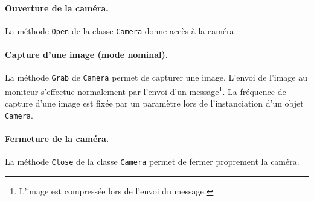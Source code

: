 \paragraph{Ouverture de la caméra.} La méthode {\tt Open} de la classe {\tt Camera} donne accès à la caméra.\\


\paragraph{Capture d'une image (mode nominal).} La méthode {\tt Grab} de {\tt Camera} permet de capturer une image. L'envoi de l'image au moniteur s'effectue normalement par l'envoi d'un message\footnote{L'image est compressée lors de l'envoi du message.}. La fréquence de capture d'une image est fixée par un paramètre lors de l'instanciation d'un objet {\tt Camera}.\\


\paragraph{Fermeture de la caméra.} La méthode {\tt Close} de la classe {\tt Camera} permet de fermer proprement la caméra.\\



